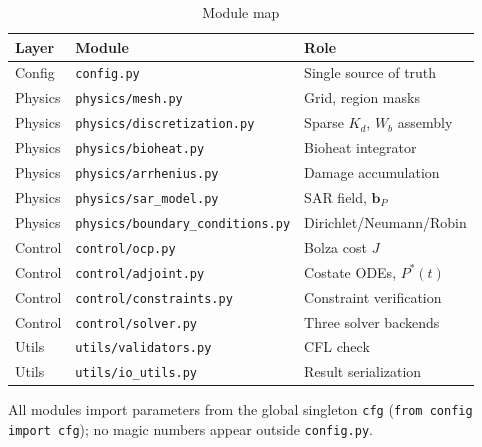 \begin{table}[htbp]
\centering
\caption{Module map}
\label{tab:modules}
\renewcommand{\arraystretch}{1.3}
\begin{tabular}{lll}
\toprule
Layer & Module & Role \\
\midrule
Config   & \texttt{config.py}                    & Single source of truth \\
Physics  & \texttt{physics/mesh.py}              & Grid, region masks \\
Physics  & \texttt{physics/discretization.py}    & Sparse $K_d$, $W_b$ assembly \\
Physics  & \texttt{physics/bioheat.py}           & Bioheat integrator \\
Physics  & \texttt{physics/arrhenius.py}         & Damage accumulation \\
Physics  & \texttt{physics/sar\_model.py}        & SAR field, $\mathbf{b}_P$ \\
Physics  & \texttt{physics/boundary\_conditions.py} & Dirichlet/Neumann/Robin \\
Control  & \texttt{control/ocp.py}               & Bolza cost $J$ \\
Control  & \texttt{control/adjoint.py}           & Costate ODEs, $P^*(t)$ \\
Control  & \texttt{control/constraints.py}       & Constraint verification \\
Control  & \texttt{control/solver.py}            & Three solver backends \\
Utils    & \texttt{utils/validators.py}          & CFL check \\
Utils    & \texttt{utils/io\_utils.py}           & Result serialization \\
\bottomrule
\end{tabular}
\end{table}

All modules import parameters from the global singleton \texttt{cfg}
(\texttt{from config import cfg}); no magic numbers appear outside
\texttt{config.py}.

